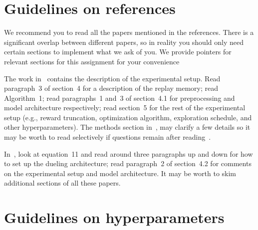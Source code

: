 \documentclass[12pt]{article}
\begin{document}
\section*{Guidelines on references}
We recommend you to read all the papers mentioned in the references. There is a significant overlap between different papers, so in reality you should only need certain sections to implement 
what we ask of you. We provide pointers for relevant sections for this assignment for your convenience

The work in~\cite{mnih2013playing} contains the description of the experimental setup. Read paragraph~3 of section~4 for a description of the replay memory; read Algorithm~1; read  paragraphs~1 and~3 of section~4.1 for preprocessing and model architecture respectively; read section~5 for the rest of the experimental setup (e.g., reward truncation, optimization algorithm, exploration schedule,
and other hyperparameters). The methods section in~\cite{mnih2015human}, may clarify a few details
so it may be worth to read selectively if questions remain after reading~\cite{mnih2013playing}.

In~\cite{wang2015dueling}, look at equation~11 and read around three paragraphs up and down for how to set up the dueling architecture; read paragraph~2 of section~4.2 for comments on the experimental setup 
and model architecture. It may be worth to skim additional sections of all these papers. 

\section*{Guidelines on hyperparameters}
\end{document}

